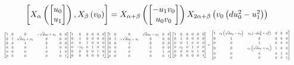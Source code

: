 \documentclass[11pt]{article}
\theoremstyle{definition}
\begin{document}
\[
\scaletoalign{\textwidth}{\left[ X_{\alpha}\left(\left[\begin{matrix}u_{0}\\u_{1}\end{matrix}\right]\right), X_{\beta}\left(v_{0}\right) \right] = X_{\alpha + \beta}\left(\left[\begin{matrix}- u_{1} v_{0}\\u_{0} v_{0}\end{matrix}\right]\right) X_{2\alpha + \beta}\left(v_{0} \left(d u_{0}^{2} - u_{1}^{2}\right)\right)}
\]
\[
\scaletoalign{\textwidth}{{\left[\begin{matrix}1 & 0 & 0 & - \sqrt{d} u_{0} + u_{1} & 0 & 0\\0 & 1 & \sqrt{d} u_{0} + u_{1} & 0 & 0 & 0\\0 & 0 & 1 & 0 & 0 & 0\\0 & 0 & 0 & 1 & 0 & 0\\0 & 0 & 0 & 0 & 1 & 0\\0 & 0 & 0 & 0 & 0 & 1\end{matrix}\right]} {\left[\begin{matrix}1 & 0 & 0 & 0 & 0 & 0\\0 & 1 & 0 & 0 & 0 & 0\\0 & 0 & 1 & 0 & 0 & 0\\0 & - v_{0} & 0 & 1 & 0 & 0\\0 & 0 & 0 & 0 & 1 & 0\\0 & 0 & 0 & 0 & 0 & 1\end{matrix}\right]} {\left[\begin{matrix}1 & 0 & 0 & \sqrt{d} u_{0} - u_{1} & 0 & 0\\0 & 1 & - \sqrt{d} u_{0} - u_{1} & 0 & 0 & 0\\0 & 0 & 1 & 0 & 0 & 0\\0 & 0 & 0 & 1 & 0 & 0\\0 & 0 & 0 & 0 & 1 & 0\\0 & 0 & 0 & 0 & 0 & 1\end{matrix}\right]} {\left[\begin{matrix}1 & 0 & 0 & 0 & 0 & 0\\0 & 1 & 0 & 0 & 0 & 0\\0 & 0 & 1 & 0 & 0 & 0\\0 & v_{0} & 0 & 1 & 0 & 0\\0 & 0 & 0 & 0 & 1 & 0\\0 & 0 & 0 & 0 & 0 & 1\end{matrix}\right]} = {\left[\begin{matrix}1 & v_{0} \left(\sqrt{d} u_{0} - u_{1}\right) & v_{0} \left(- d u_{0}^{2} + u_{1}^{2}\right) & 0 & 0 & 0\\0 & 1 & 0 & 0 & 0 & 0\\0 & 0 & 1 & 0 & 0 & 0\\0 & 0 & v_{0} \left(\sqrt{d} u_{0} + u_{1}\right) & 1 & 0 & 0\\0 & 0 & 0 & 0 & 1 & 0\\0 & 0 & 0 & 0 & 0 & 1\end{matrix}\right]}}
\]
\end{document}
